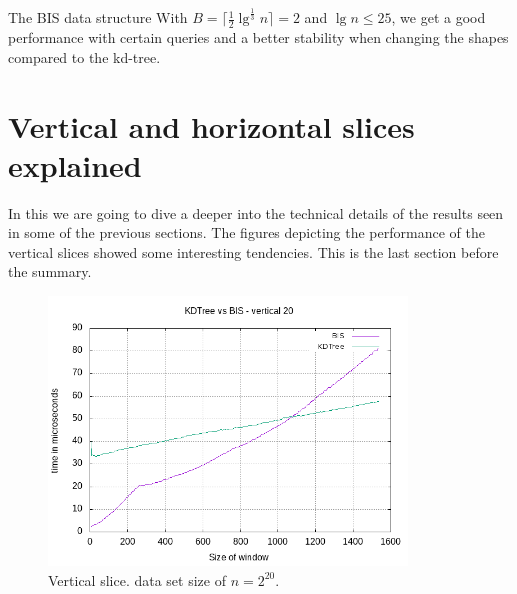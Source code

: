 The BIS data structure With $B = \lceil \frac{1}{2}\lg^{\frac{1}{3}} n \rceil = 2$ and $\lg n \leq 25$, we get a good performance with certain queries and a better stability when changing the shapes compared to the kd-tree. 


\section{Vertical and horizontal slices explained}
\label{sect:verthoriexp}

In this we are going to dive a deeper into the technical details of the results seen in some of the previous sections. The figures depicting the performance of the vertical slices showed some interesting tendencies. This is the last section before the summary.

\begin{figure}[h]
    \centering
    \includegraphics[width = 0.85\textwidth]{pictures/analysis/vert_20.png}
    \caption{Vertical slice. data set size of $n=2^{20}$.}\label{fig:vert_20}
\end{figure}


